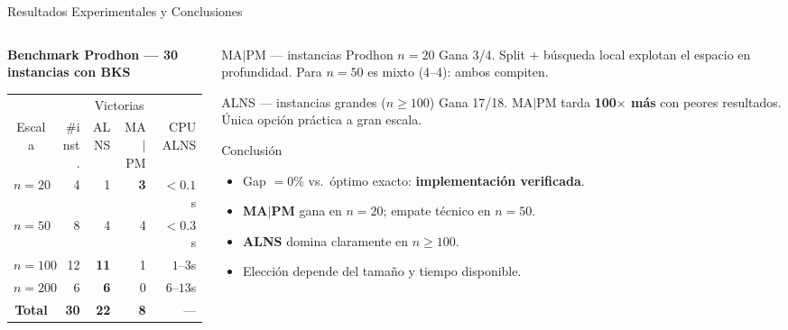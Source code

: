 \documentclass[aspectratio=169,10pt]{beamer}
\begin{document}
\begin{frame}{Resultados Experimentales y Conclusiones}
\begin{columns}[T,onlytextwidth]
\begin{column}{0.50\textwidth}
      \textbf{Benchmark Prodhon — 30 instancias con BKS}
      \vspace{0.15em}
      \begin{center}\scriptsize
      \begin{tabular}{crrrr}
        \toprule
        & & \multicolumn{2}{c}{Victorias} & \\
        \cmidrule(lr){3-4}
        Escala & \#inst. & ALNS & MA$|$PM & CPU ALNS \\
        \midrule
        $n{=}20$  & 4  & 1 & \textbf{3} & ${<}0.1$s \\
        $n{=}50$  & 8  & 4 & 4          & ${<}0.3$s \\
        $n{=}100$ & 12 & \textbf{11} & 1 & $1$--$3$s \\
        $n{=}200$ & 6  & \textbf{6}  & 0 & $6$--$13$s \\
        \midrule
        \textbf{Total} & \textbf{30} & \textbf{22} & \textbf{8} & --- \\
        \bottomrule
      \end{tabular}
      \end{center}
    \end{column}
    \begin{column}{0.48\textwidth}
      \begin{exampleblock}{MA$|$PM --- instancias Prodhon $n{=}20$}\footnotesize
        Gana 3/4. Split + búsqueda local explotan el espacio en
        profundidad. Para $n{=}50$ es mixto (4--4): ambos compiten.
      \end{exampleblock}
      \vspace{0.1em}
      \begin{alertblock}{ALNS --- instancias grandes ($n \ge 100$)}\footnotesize
        Gana 17/18. MA$|$PM tarda \textbf{100$\times$ más}
        con peores resultados. Única opción práctica a gran escala.
      \end{alertblock}
      \vspace{0.1em}
      \begin{block}{Conclusión}\footnotesize
        \begin{itemize}\setlength{\itemsep}{0pt}
          \item Gap $=0\%$ vs.\ óptimo exacto: \textbf{implementación verificada}.
          \item \textbf{MA$|$PM} gana en $n{=}20$; empate técnico en $n{=}50$.
          \item \textbf{ALNS} domina claramente en $n \ge 100$.
          \item Elección depende del tamaño y tiempo disponible.
        \end{itemize}
      \end{block}
    \end{column}
  \end{columns}
\end{frame}
\end{document}
